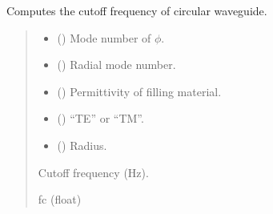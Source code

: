 \documentclass[letterpaper,10pt,english]{sphinxmanual}
\begin{document}

\begin{fulllineitems}
\label{\detokenize{components:components.fcutoff_CWG}}
\pysigstartsignatures
{}
\pysigstopsignatures
\sphinxAtStartPar
Computes the cutoff frequency of circular waveguide.
\begin{quote}\begin{description}
\begin{itemize}
\item {} 
\sphinxAtStartPar
{} () \textendash{} Mode number of \(\phi\).

\item {} 
\sphinxAtStartPar
{} () \textendash{} Radial mode number.

\item {} 
\sphinxAtStartPar
{} () \textendash{} Permittivity of filling material.

\item {} 
\sphinxAtStartPar
{} () \textendash{} “TE” or “TM”.

\item {} 
\sphinxAtStartPar
{} () \textendash{} Radius.

\end{itemize}

\sphinxAtStartPar
Cutoff frequency (Hz).

\sphinxAtStartPar
fc (float)

\end{description}\end{quote}

\end{fulllineitems}
\end{document}
